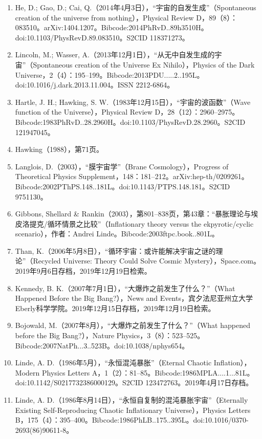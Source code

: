 \begin{enumerate}
\item He, D.; Gao, D.; Cai, Q.（2014年4月3日），“宇宙的自发生成”（Spontaneous creation of the universe from nothing），Physical Review D，89（8）：083510。arXiv:1404.1207。Bibcode:2014PhRvD..89h3510H。doi:10.1103/PhysRevD.89.083510。S2CID 118371273。  
\item Lincoln, M.; Wasser, A.（2013年12月1日），“从无中自发生成的宇宙”（Spontaneous creation of the Universe Ex Nihilo），Physics of the Dark Universe，2（4）：195–199。Bibcode:2013PDU.....2..195L。doi:10.1016/j.dark.2013.11.004。ISSN 2212-6864。  
\item Hartle, J. H.; Hawking, S. W.（1983年12月15日），“宇宙的波函数”（Wave function of the Universe），Physical Review D，28（12）：2960–2975。Bibcode:1983PhRvD..28.2960H。doi:10.1103/PhysRevD.28.2960。S2CID 121947045。  
\item Hawking（1988），第71页。  
\item Langlois, D.（2003），“膜宇宙学”（Brane Cosmology），Progress of Theoretical Physics Supplement，148：181–212。arXiv:hep-th/0209261。Bibcode:2002PThPS.148..181L。doi:10.1143/PTPS.148.181。S2CID 9751130。  
\item Gibbons, Shellard & Rankin（2003），第801–838页，第43章：“暴胀理论与埃皮洛提克/循环情景之比较”（Inflationary theory versus the ekpyrotic/cyclic scenario），作者：Andrei Linde。Bibcode:2003ftpc.book..801L。  
\item Than, K.（2006年5月8日），“循环宇宙：或许能解决宇宙之谜的理论”（Recycled Universe: Theory Could Solve Cosmic Mystery），Space.com。2019年9月6日存档，2019年12月19日检索。  
\item Kennedy, B. K.（2007年7月1日），“大爆炸之前发生了什么？”（What Happened Before the Big Bang?），News and Events，宾夕法尼亚州立大学Eberly科学学院。2019年12月15日存档，2019年12月19日检索。  
\item Bojowald, M.（2007年8月），“大爆炸之前发生了什么？”（What happened before the Big Bang?），Nature Physics，3（8）：523–525。Bibcode:2007NatPh...3..523B。doi:10.1038/nphys654。  
\item Linde, A. D.（1986年5月），“永恒混沌暴胀”（Eternal Chaotic Inflation），Modern Physics Letters A，1（2）：81–85。Bibcode:1986MPLA....1...81L。doi:10.1142/S0217732386000129。S2CID 123472763。2019年4月17日存档。  
\item Linde, A. D.（1986年8月14日），“永恒自复制的混沌暴胀宇宙”（Eternally Existing Self-Reproducing Chaotic Inflationary Universe），Physics Letters B，175（4）：395–400。Bibcode:1986PhLB..175..395L。doi:10.1016/0370-2693(86)90611-8。  

\end{enumerate}
